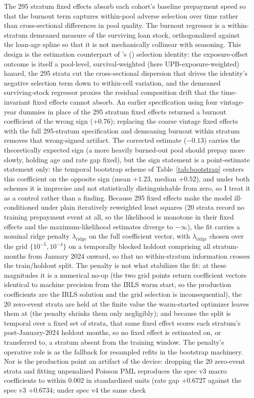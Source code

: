 \documentclass[12pt]{article}
\newcommand{\citepos}[1]{\citeauthor{#1}'s (\citeyear{#1})}
\begin{document}
The 295 stratum fixed effects absorb each cohort's baseline prepayment speed so that the burnout term captures within-pool adverse selection over time rather than cross-sectional differences in pool quality. The burnout regressor is a within-stratum demeaned measure of the surviving loan stock, orthogonalized against the loan-age spline so that it is not mechanically collinear with seasoning. This design is the estimation counterpart of \citepos{lesniewski2026} selection identity: the exposure-offset outcome is itself a pool-level, survival-weighted (here UPB-exposure-weighted) hazard, the 295 strata cut the cross-sectional dispersion that drives the identity's negative selection term down to within-cell variation, and the demeaned surviving-stock regressor proxies the residual composition drift that the time-invariant fixed effects cannot absorb. An earlier specification using four vintage-year dummies in place of the 295 stratum fixed effects returned a burnout coefficient of the wrong sign (+0.76); replacing the coarse vintage fixed effects with the full 295-stratum specification and demeaning burnout within stratum removes that wrong-signed artifact. The corrected estimate ($-0.13$) carries the theoretically expected sign (a more heavily burned-out pool should prepay more slowly, holding age and rate gap fixed), but the sign statement is a point-estimate statement only: the temporal bootstrap scheme of Table~\ref{tab:bootstrap} centers this coefficient on the opposite sign (mean $+1.23$, median $+0.52$), and under both schemes it is imprecise and not statistically distinguishable from zero, so I treat it as a control rather than a finding. Because 295 fixed effects make the model ill-conditioned under plain iteratively reweighted least squares (20 strata record no training prepayment event at all, so the likelihood is monotone in their fixed effects and the maximum-likelihood estimates diverge to $-\infty$), the fit carries a nominal ridge penalty $\lambda_{\mathrm{ridge}}$ on the full coefficient vector, with $\lambda_{\mathrm{ridge}}$ chosen over the grid $\{10^{-5}, 10^{-4}\}$ on a temporally blocked holdout comprising all stratum-months from January 2024 onward, so that no within-stratum information crosses the train/holdout split. The penalty is not what stabilizes the fit: at these magnitudes it is a numerical no-op (the two grid points return coefficient vectors identical to machine precision from the IRLS warm start, so the production coefficients are the IRLS solution and the grid selection is inconsequential), the 20 zero-event strata are held at the finite value the warm-started optimizer leaves them at (the penalty shrinks them only negligibly); and because the split is temporal over a fixed set of strata, that same fixed effect scores each stratum's post-January-2024 holdout months, so no fixed effect is estimated on, or transferred to, a stratum absent from the training window. The penalty's operative role is as the fallback for resampled refits in the bootstrap machinery. Nor is the production point an artifact of the device: dropping the 20 zero-event strata and fitting unpenalized Poisson PML reproduces the spec v3 macro coefficients to within $0.002$ in standardized units (rate gap $+0.6727$ against the spec v3 $+0.6734$; under spec v4 the same check 
\end{document}
